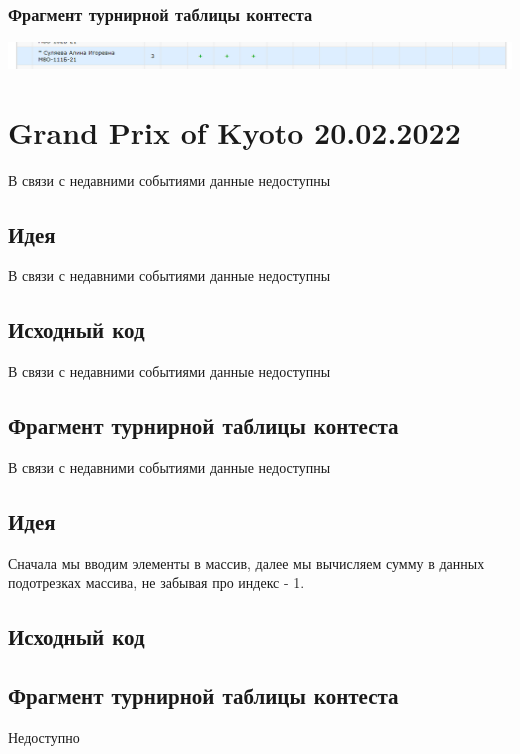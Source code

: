 \subsubsection*{Фрагмент турнирной таблицы контеста}
\begin{center} 
\includegraphics[scale=0.5]{standings/8.png}\newline\noindent
\end{center} 
\pagebreak

\section*{Grand Prix of Kyoto 20.02.2022}
В связи с недавними событиями данные недоступны
\subsection*{Идея}
В связи с недавними событиями данные недоступны
\subsection*{Исходный код}
В связи с недавними событиями данные недоступны
\subsection*{Фрагмент турнирной таблицы контеста}
В связи с недавними событиями данные недоступны
\newline\noindent
\pagebreak


\subsection*{Идея}
Сначала мы вводим элементы в массив, далее мы вычисляем сумму в данных подотрезках массива, не забывая про индекс - 1.
\subsection*{Исходный код}

\subsection*{Фрагмент турнирной таблицы контеста}
Недоступно
\pagebreak

